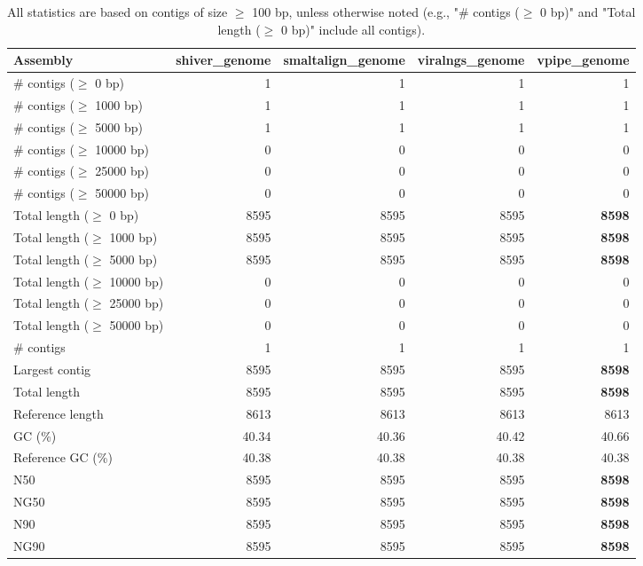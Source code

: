 \documentclass[12pt,a4paper]{article}
\begin{document}
\begin{table}[ht]
\begin{center}
\caption{All statistics are based on contigs of size $\geq$ 100 bp, unless otherwise noted (e.g., "\# contigs ($\geq$ 0 bp)" and "Total length ($\geq$ 0 bp)" include all contigs).}
\begin{tabular}{|l*{4}{|r}|}
\hline
Assembly & shiver\_genome & smaltalign\_genome & viralngs\_genome & vpipe\_genome \\ \hline
\# contigs ($\geq$ 0 bp) & 1 & 1 & 1 & 1 \\ \hline
\# contigs ($\geq$ 1000 bp) & 1 & 1 & 1 & 1 \\ \hline
\# contigs ($\geq$ 5000 bp) & 1 & 1 & 1 & 1 \\ \hline
\# contigs ($\geq$ 10000 bp) & 0 & 0 & 0 & 0 \\ \hline
\# contigs ($\geq$ 25000 bp) & 0 & 0 & 0 & 0 \\ \hline
\# contigs ($\geq$ 50000 bp) & 0 & 0 & 0 & 0 \\ \hline
Total length ($\geq$ 0 bp) & 8595 & 8595 & 8595 & {\bf 8598} \\ \hline
Total length ($\geq$ 1000 bp) & 8595 & 8595 & 8595 & {\bf 8598} \\ \hline
Total length ($\geq$ 5000 bp) & 8595 & 8595 & 8595 & {\bf 8598} \\ \hline
Total length ($\geq$ 10000 bp) & 0 & 0 & 0 & 0 \\ \hline
Total length ($\geq$ 25000 bp) & 0 & 0 & 0 & 0 \\ \hline
Total length ($\geq$ 50000 bp) & 0 & 0 & 0 & 0 \\ \hline
\# contigs & 1 & 1 & 1 & 1 \\ \hline
Largest contig & 8595 & 8595 & 8595 & {\bf 8598} \\ \hline
Total length & 8595 & 8595 & 8595 & {\bf 8598} \\ \hline
Reference length & 8613 & 8613 & 8613 & 8613 \\ \hline
GC (\%) & 40.34 & 40.36 & 40.42 & 40.66 \\ \hline
Reference GC (\%) & 40.38 & 40.38 & 40.38 & 40.38 \\ \hline
N50 & 8595 & 8595 & 8595 & {\bf 8598} \\ \hline
NG50 & 8595 & 8595 & 8595 & {\bf 8598} \\ \hline
N90 & 8595 & 8595 & 8595 & {\bf 8598} \\ \hline
NG90 & 8595 & 8595 & 8595 & {\bf 8598} \\ \hline

\end{tabular}
\end{center}
\end{table}
\end{document}
